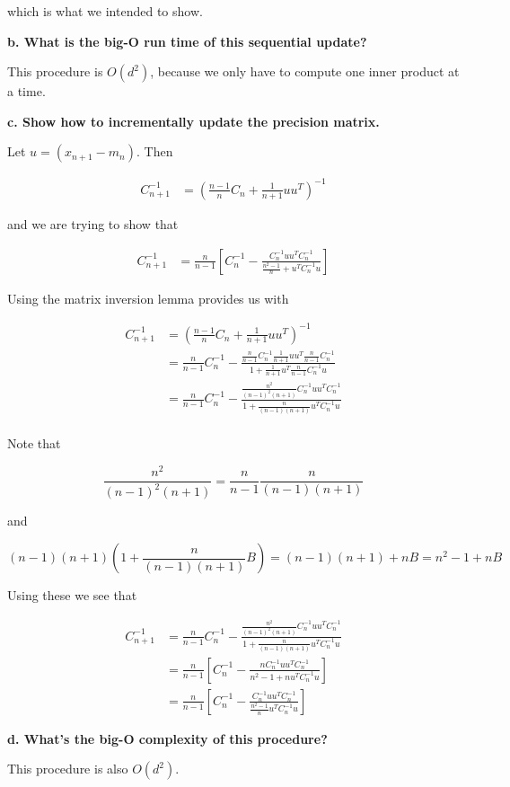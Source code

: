 {which is what we intended to show.

\textbf{b. What is the big-O run time of this sequential update?}

This procedure is $O(d^2)$, because we only have to compute one inner
product at a time.

\textbf{c. Show how to incrementally update the precision matrix.}

Let $u = (x_{n+1}-m_n)$. Then

\begin{align}
    C_{n+1}^{-1} & = \left (\frac{n-1}{n}C_n+\frac{1}{n+1}uu^T\right )^{-1}
\end{align}

and we are trying to show that

\begin{align}
    C_{n+1}^{-1} & = \frac{n}{n-1} \left [C_n^{-1} -
         \frac{C_n^{-1}uu^TC_n^{-1}}{\frac{n^2-1}{n}+u^TC_n^{-1}u}\right ]
\end{align}

Using the matrix inversion lemma provides us with

\begin{align}
    C_{n+1}^{-1} & = \left (\frac{n-1}{n}C_n+\frac{1}{n+1}uu^T\right )^{-1} \\
    & = \frac{n}{n-1}C_n^{-1} - \frac{\frac{n}{n-1}C_n^{-1}
        \frac{1}{n+1}uu^T\frac{n}{n-1}C_n^{-1}}
             {1+\frac{1}{n+1}u^T\frac{n}{n-1}C_n^{-1}u} \\
    & = \frac{n}{n-1}C_n^{-1} - \frac{\frac{n^2}{(n-1)^2(n+1)}
        C_n^{-1}uu^TC_n^{-1}}{1+\frac{n}{(n-1)(n+1)}u^TC_n^{-1}u} \\
\end{align}

Note that

$$\frac{n^2}{(n-1)^2(n+1)} = \frac{n}{n-1} \frac{n}{(n-1)(n+1)}$$

and

$$(n-1)(n+1)(1 + \frac{n}{(n-1)(n+1)} B) = (n-1)(n+1) + nB = n^2 - 1 + nB$$

Using these we see that

\begin{align}
    C_{n+1}^{-1} & = \frac{n}{n-1}C_n^{-1} - \frac{\frac{n^2}{(n-1)^2(n+1)}
        C_n^{-1}uu^TC_n^{-1}}{1+\frac{n}{(n-1)(n+1)}u^TC_n^{-1}u} \\
    & = \frac{n}{n-1}\left [ C_n^{-1} - \frac{nC_n^{-1}uu^TC_n^{-1}}
        {n^2-1+nu^TC_n^{-1}u} \right ] \\
    & = \frac{n}{n-1}\left [ C_n^{-1} - \frac{C_n^{-1}uu^TC_n^{-1}}
        {\frac{n^2-1}{n}u^TC_n^{-1}u} \right ]
\end{align}

\textbf{d. What's the big-O complexity of this procedure?}

This procedure is also $O(d^2)$.

}

